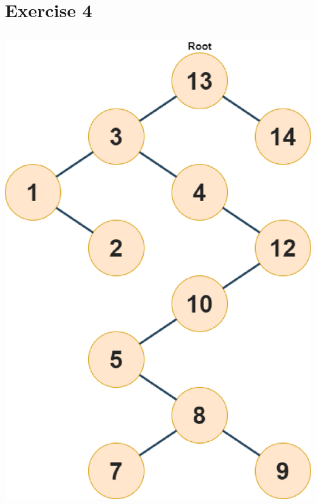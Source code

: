 \documentclass{article}
\begin{document}
\section{Exercise 4}

\subsection{}
\begin{center}
    \includegraphics[scale=.4]{./img/4_1.eps}   %
\end{center}
\end{document}
